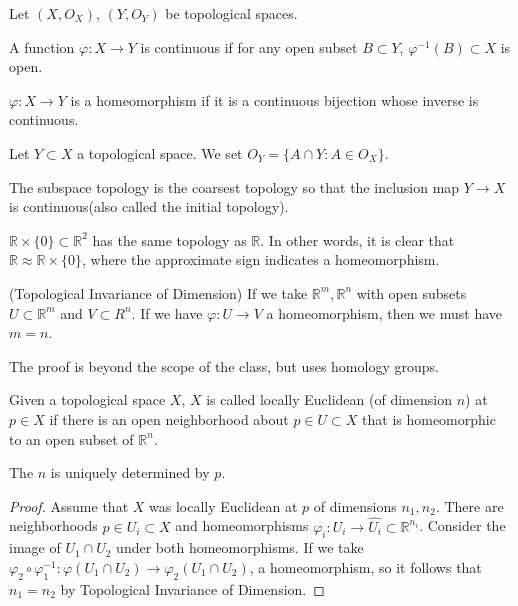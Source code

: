 \documentclass[12pt]{scrartcl}
\newcommand{\R}{\mathbb{R}}
\renewcommand{\hat}{\widehat}
\let \phi \varphi
\begin{document}
Let $(X, O_X)$, $(Y, O_Y)$ be topological spaces.  

\begin{definition} A function $\phi : X \to Y$ is continuous if for any open subset $B \subset Y$, $\phi^{-1}(B) \subset X$ is open.  
\end{definition}

\begin{definition} $\phi: X \to Y$ is a homeomorphism if it is a continuous bijection whose inverse is continuous.  
\end{definition}

\begin{definition} Let $Y \subset X$ a topological space.  We set $O_Y = \{A \cap Y : A \in O_X\}$.
\end{definition}

\begin{example}
The subspace topology is the coarsest topology so that the inclusion map $Y \to X$ is continuous(also called the initial topology).  
\end{example}
\begin{example} $\R \times \{0\} \subset \R^2$ has the same topology as $\R$.  In other words, it is clear that $\R \approx \R \times \{0\}$, where the approximate sign indicates a homeomorphism.
\end{example}

\begin{thm} (Topological Invariance of Dimension) If we take $\R^m, \R^n$ with open subsets $U \subset \R^m$ and $V \subset R^n$.  If we have $\phi: U \to V$ a homeomorphism, then we must have $m = n$.
\end{thm}
The proof is beyond the scope of the class, but uses homology groups.  

\begin{definition} Given a topological space $X$, $X$ is called locally Euclidean (of dimension $n$) at $p \in X$ if there is an open neighborhood about $p \in U \subset X$ that is homeomorphic to an open subset of $\R^n$.
\end{definition}

\begin{lemma} The $n$ is uniquely determined by $p$.  
\end{lemma}
\begin{proof} Assume that $X$ was locally Euclidean at $p$ of dimensions $n_1, n_2$.  There are neighborhoods $p \in U_i \subset X$ and homeomorphisms $\phi_i : U_i \to \hat{U_i} \subset \R^{n_i}$.  Consider the image of $U_1 \cap U_2$ under both homeomorphisms.  If we take $\phi_2 \circ \phi_1^{-1}: \phi(U_1 \cap U_2) \to \phi_2(U_1 \cap U_2)$, a homeomorphism, so it follows that $n_1 = n_2$ by Topological Invariance of Dimension.
\end{proof}
\end{document}
